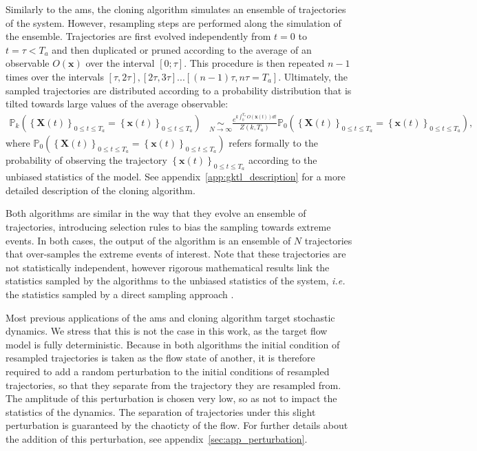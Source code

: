 \documentclass{jfm}
\begin{document}
Similarly to the \ac{ams}, the cloning algorithm simulates an ensemble of trajectories of the system.
However, resampling steps are performed along the simulation of the ensemble.
Trajectories are first evolved independently from $t = 0$ to $t=\tau < T_a$ and then duplicated or pruned
according to the average of an observable $O(\mathbf{x})$ over the interval $[0;\tau]$.
This procedure is then repeated $n-1$ times over the intervals $[\tau, 2\tau], [2\tau, 3\tau]... [(n-1)\tau, n\tau = T_a]$.
Ultimately, the sampled trajectories are distributed according to a probability distribution that is tilted towards large values of the average observable:
\begin{align}
\mathbb{P}_{k}\left(\left\{ \mathbf{X}(t)\right\} _{0\leq t\leq T_{a}}=\left\{ \mathbf{x}(t)\right\} _{0\leq t\leq T_{a}}\right) &\underset{N\rightarrow\infty}{\sim} \frac{e^{k\int_{0}^{T_{a}}O(\mathbf{x}(t))dt}}{Z(k,T_a)}\mathbb{\mathbb{P}}_{0}\left(\left\{ \mathbf{X}(t)\right\} _{0\leq t\leq T_{a}}=\left\{ \mathbf{x}(t)\right\} _{0\leq t\leq T_{a}}\right),
\label{eq:Biased_Path_Approximation_main}
\end{align}
where
$\mathbb{P}_{0}\left(\left\{ \mathbf{X}(t)\right\} _{0\leq t\leq T_{a}} = \left\{ \mathbf{x}(t)\right\} _{0\leq t\leq T_{a}}\right)$ refers formally to the probability of observing the trajectory 
$\left\{ \mathbf{x}(t)\right\} _{0\leq t\leq T_{a}}$ according to the unbiased statistics of the model.
See appendix~\ref{app:gktl_description} for a more detailed description of the cloning algorithm.

Both algorithms are similar in the way that they evolve an ensemble of trajectories, introducing selection
rules to bias the sampling towards extreme events.
In both cases, the output of the algorithm is an ensemble of $N$ trajectories that over-samples the extreme
events of interest.
Note that these trajectories are not statistically independent, however rigorous mathematical results link the statistics sampled by the algorithms to the unbiased statistics of the system, \textit{i.e.} the statistics sampled by a direct sampling approach \citep{DelMoral2013, brehier:hal-01142704}.

Most previous applications of the \ac{ams} and cloning algorithm target stochastic dynamics.
We stress that this is not the case in this work, as the target flow model is fully deterministic.
Because in both algorithms the initial condition of resampled trajectories is taken as the flow state of another, it is therefore required to add a random perturbation to the initial conditions of resampled trajectories, so that they separate from the trajectory they are resampled from.
The amplitude of this perturbation is chosen very low, so as not to impact the statistics of the dynamics.
The separation of trajectories under this slight perturbation is guaranteed by the chaoticty of the flow.
For further details about the addition of this perturbation, see appendix~\ref{sec:app_perturbation}.
\end{document}
